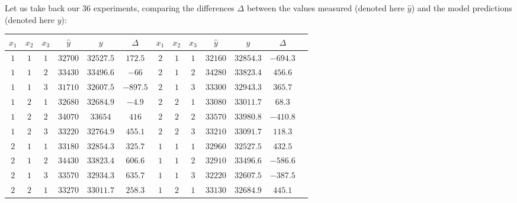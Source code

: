 	Let us take back our $36$ experiments, comparing the differences $\Delta$ between the values measured (denoted here $\hat{y}$) and the model predictions (denoted here $y$):
	\begin{table}[H]\centering
		\begin{center}
			\begin{tabular}{|c|c|c|c|c|c|c|c|c|c|c|c|c|}
			\hline				
			  \multicolumn{1}{c}{\cellcolor{black!30}$x_1$} & 
			  \multicolumn{1}{c}{\cellcolor{black!30}$x_2$} & 
			  \multicolumn{1}{c}{\cellcolor{black!30}$x_3$} & 
			  \multicolumn{1}{c}{\cellcolor{black!30}$\hat{y}$} & 
			  \multicolumn{1}{c}{\cellcolor{black!30}$y$} & 
			  \multicolumn{1}{c}{\cellcolor{black!30}$\Delta$} &
			  \multicolumn{1}{c}{\cellcolor{black!30}$x_1$} & 
			  \multicolumn{1}{c}{\cellcolor{black!30}$x_2$} & 
			  \multicolumn{1}{c}{\cellcolor{black!30}$x_3$} & 
			  \multicolumn{1}{c}{\cellcolor{black!30}$\hat{y}$} & 
			  \multicolumn{1}{c}{\cellcolor{black!30}$y$} & 
			  \multicolumn{1}{c}{\cellcolor{black!30}$\Delta$} \\ \hline
				$1$ & $1$ & $1$ & $32700$ & $32527.5$ & $172.5$ & $2$ & $1$ & $1$ & $32160$ & $32854.3$ & $-694.3$\\ \hline
				$1$ & $1$ & $2$ & $33430$ & $33496.6$ & $-66$ & $2$ & $1$ & $2$ & $34280$ & $33823.4$ & $456.6$\\ \hline
				$1$ & $1$ & $3$ & $31710$ & $32607.5$ & $-897.5$ & $2$ & $1$ & $3$ & $33300$ & $32943.3$ & $365.7$\\ \hline
				$1$ & $2$ & $1$ & $32680$ & $32684.9$ & $-4.9$ & $2$ & $2$ & $1$ & $33080$ & $33011.7$ & $68.3$\\ \hline
				$1$ & $2$ & $2$ & $34070$ & $33654$ & $416$ & $2$ & $2$ & $2$ & $33570$ & $33980.8$ & $-410.8$\\ \hline
				$1$ & $2$ & $3$ & $33220$ & $32764.9$ & $455.1$ & $2$ & $2$ & $3$ & $33210$ & $33091.7$ & $118.3$\\ \hline
				$2$ & $1$ & $1$ & $33180$ & $32854.3$ & $325.7$ & $1$ & $1$ & $1$ & $32960$ & $32527.5$ & $432.5$\\ \hline
				$2$ & $1$ & $2$ & $34430$ & $33823.4$ & $606.6$ & $1$ & $1$ & $2$ & $32910$ & $33496.6$ & $-586.6$\\ \hline
				$2$ & $1$ & $3$ & $33570$ & $32934.3$ & $635.7$ & $1$ & $1$ & $3$ & $32220$ & $32607.5$ & $-387.5$\\ \hline
				$2$ & $2$ & $1$ & $33270$ & $33011.7$ & $258.3$ & $1$ & $2$ & $1$ & $33130$ & $32684.9$ & $445.1$\\ \hline

\end{tabular}
\end{center}
\end{table}
